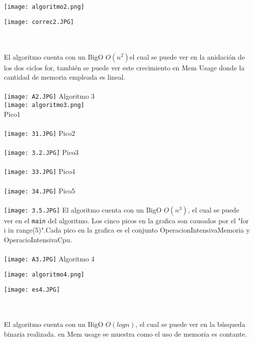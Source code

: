 \documentclass{article}
\begin{document}
\begin{minipage}{0.6\textwidth}
  \centering
  \texttt{[image: algoritmo2.png]}
\end{minipage}
\hfill
\begin{minipage}{0.5\textwidth}
\texttt{[image: correc2.JPG]}
\end{minipage}
\\\\
El algoritmo cuenta con un BigO \( O(n^2) \)el cual se puede ver en la anidación de los dos ciclos for, también se puede ver este crecimiento en Mem Usage  donde la cantidad de memoria empleada es lineal. 
\\\\
\texttt{[image: A2.JPG]}
\newpage
\large Algoritmo 3\\
\texttt{[image: algoritmo3.png]}
\\
\large Pico1\\\\
\texttt{[image: 31.JPG]}
\large Pico2\\\\
\texttt{[image: 3.2.JPG]}
\large Pico3\\\\
\texttt{[image: 33.JPG]}
\large Pico4\\\\
\texttt{[image: 34.JPG]}
\large Pico5\\\\
\texttt{[image: 3.5.JPG]}
El algoritmo cuenta con un BigO \( O(n^3) \), el cual se puede ver en el \texttt{main} del algoritmo. Los cinco picos 
 en la grafica son causados por el "for i in range(5)".Cada pico en la grafica es el conjunto OperacionIntensivaMemoria y OperacioIntensivaCpu.\\\\
\texttt{[image: A3.JPG]}
\newpage
\large Algoritmo 4\\
\begin{minipage}{0.6\textwidth}
  \centering
  \texttt{[image: algoritmo4.png]}
\end{minipage}
\hfill
\begin{minipage}{0.5\textwidth}
\texttt{[image: es4.JPG]}
\end{minipage}
\\\\El algoritmo cuenta con un BigO \( O(log n) \), el cual se puede ver en la búsqueda binaria realizada. en Mem usage se muestra como el uso de memoria es contante.\\\\\\
\end{document}
